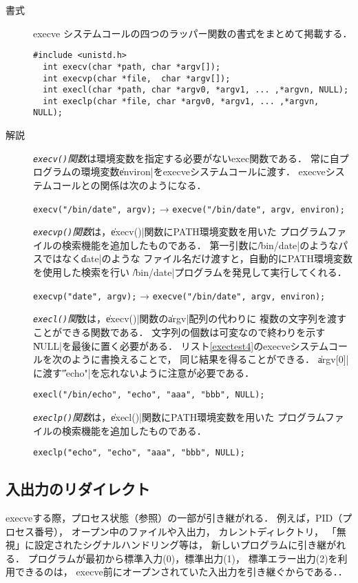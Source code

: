 \begin{description}
\item[書式]
  execve システムコールの四つのラッパー関数の書式をまとめて掲載する．
\begin{lstlisting}[numbers=none]
  #include <unistd.h>
  int execv(char *path, char *argv[]);
  int execvp(char *file,  char *argv[]);
  int execl(char *path, char *argv0, *argv1, ... ,*argvn, NULL);
  int execlp(char *file, char *argv0, *argv1, ... ,*argvn, NULL);
\end{lstlisting}

\item [解説]
  \emph{\texttt{execv()}関数}は環境変数を指定する必要がないexec関数である．
  常に自プログラムの環境変数\|environ|をexecveシステムコールに渡す．
  execveシステムコールとの関係は次のようになる．

  \centerline{\texttt{execv("/bin/date", argv);}
    →  \texttt{execve("/bin/date", argv, environ);}}

  \emph{\texttt{execvp()}関数}は，\|execv()|関数にPATH環境変数を用いた
  プログラムファイルの検索機能を追加したものである．
  第一引数に\|/bin/date|のようなパスではなく\|date|のような
  ファイル名だけ渡すと，自動的にPATH環境変数を使用した検索を行い
  \|/bin/date|プログラムを発見して実行してくれる．
  
  \centerline{\texttt{execvp("date", argv);}
    →  \texttt{execve("/bin/date", argv, environ);}}

  \emph{\texttt{execl()}関}数は，\|execv()|関数の\|argv|配列の代わりに
  複数の文字列を渡すことができる関数である．
  文字列の個数は可変なので終わりを示す\| NULL|を最後に置く必要がある．
  リスト\ref{exectest4}のexecveシステムコールを次のように書換えることで，
  同じ結果を得ることができる．
  \|argv[0]|に渡す\|"echo"|を忘れないように注意が必要である．

  \centerline{\texttt{execl("/bin/echo", "echo", "aaa", "bbb", NULL);}}

  \emph{\texttt{execlp()}関数}は，\|execl()|関数にPATH環境変数を用いた
  プログラムファイルの検索機能を追加したものである．

  \centerline{\texttt{execlp("echo", "echo", "aaa", "bbb", NULL);}}

\end{description}

\subsection{入出力のリダイレクト}
execveする際，プロセス状態（参照）の一部が引き継がれる．
例えば，PID（プロセス番号），
オープン中のファイルや入出力，
カレントディレクトリ，
「無視」に設定されたシグナルハンドリング等は，
新しいプログラムに引き継がれる．
プログラムが最初から標準入力(0)，標準出力(1)，
標準エラー出力(2)を利用できるのは，
execve前にオープンされていた入出力を引き継ぐからである．．

